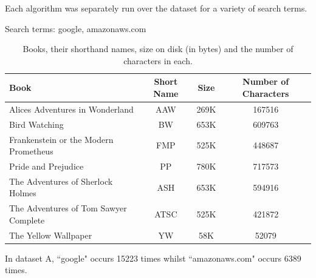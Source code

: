\documentclass{article}
\begin{document}
Each algorithm was separately run over the dataset for a variety of search terms.

Search terms: google, amazonaws.com

\begin{table}[h!bt]
  \centering
  \begin{tabular}{l|ccc}
    Book & Short Name & Size & Number of Characters\\
    \hline
    Alices Adventures in Wonderland & AAW & 269K & 167516\\
    Bird Watching & BW & 653K & 609763\\
    Frankenstein or the Modern Prometheus & FMP & 525K & 448687\\
    Pride and Prejudice & PP & 780K & 717573\\
    The Adventures of Sherlock Holmes & ASH & 653K & 594916\\
    The Adventures of Tom Sawyer Complete & ATSC & 525K & 421872\\
    The Yellow Wallpaper & YW & 58K & 52079
  \end{tabular}
  \caption{Books, their shorthand names, size on disk (in bytes) and the number of characters in each.}
  \label{table:book-reference}
\end{table}

In dataset A, ``google" occurs 15223 times whilst ``amazonaws.com" occurs 6389 times.
\end{document}
